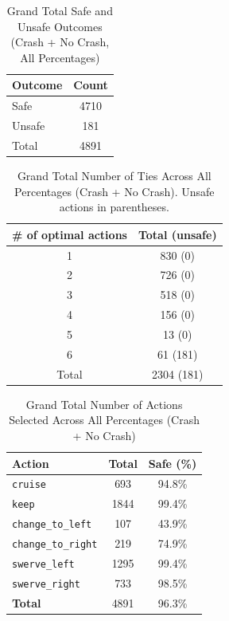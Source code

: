 \documentclass{article}
\begin{document}
\begin{table}[h]
\centering
\caption{Grand Total Safe and Unsafe Outcomes (Crash + No Crash, All Percentages)}
\begin{tabular}{lc}
\toprule
Outcome & Count \\
\midrule
Safe & 4710 \\ 
Unsafe & 181 \\ 
\midrule
Total & 4891 \\ 
\bottomrule
\end{tabular}
\end{table}

\begin{table}[h]
\centering
\caption{Grand Total Number of Ties Across All Percentages (Crash + No Crash).
Unsafe actions in parentheses.}
\begin{tabular}{c|c}
\toprule
\# of optimal actions & Total (unsafe) \\
\midrule
1 & 830 (0) \\ 
2 & 726 (0) \\ 
3 & 518 (0) \\ 
4 & 156 (0) \\ 
5 & 13 (0) \\ 
6 & 61 (181) \\ 
\midrule
Total & 2304 (181) \\ 
\bottomrule
\end{tabular}
\end{table}

\begin{table}[h]
\centering
\caption{Grand Total Number of Actions Selected Across All Percentages (Crash + No Crash)}
\begin{tabular}{l|c|c}
\toprule
Action & Total & Safe (\%) \\
\midrule
\texttt{cruise} & 693 & 94.8\% \\ 
\texttt{keep} & 1844 & 99.4\% \\ 
\texttt{change\_to\_left} & 107 & 43.9\% \\ 
\texttt{change\_to\_right} & 219 & 74.9\% \\ 
\texttt{swerve\_left} & 1295 & 99.4\% \\ 
\texttt{swerve\_right} & 733 & 98.5\% \\ 
\midrule
\textbf{Total} & 4891 & 96.3\% \\ 
\bottomrule
\end{tabular}
\end{table}
\end{document}
